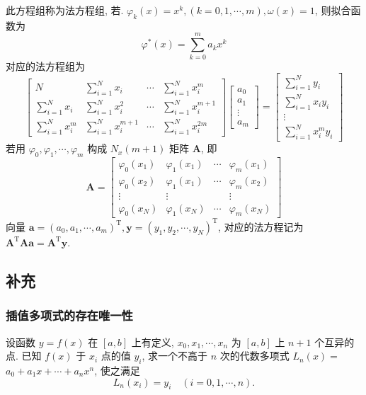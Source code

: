 此方程组称为法方程组,
若. $ \varphi_{k}(x)=x^{k},(k=0,1, \cdots, m), \omega(x)=1 $, 则拟合函数为
$$
\varphi^{*}(x)=\sum_{k=0}^{m} a_{k} x^{k}
$$
对应的法方程组为
$$
\left[\begin{array}{llll}
N &\sum\limits_{i=1}^{N} x_{i} & \cdots & \sum\limits_{i=1}^{N} x_{i}^{m} \\
\sum\limits_{i=1}^{N} x_{i} & \sum\limits_{i=1}^{N} x_{i}^{2} & \cdots & \sum\limits_{i=1}^{N} x_{i}^{m+1} \\
\sum\limits_{i=1}^{N} x_{i}^{m} & \sum\limits_{i=1}^{N} x_{i}^{m+1} & \cdots & \sum\limits_{i=1}^{N} x_{i}^{2 m}
\end{array}\right]\left[\begin{array}{c}
a_{0} \\
a_{1} \\
\vdots \\
a_{m}
\end{array}\right]=\left[\begin{array}{l}
\sum\limits_{i=1}^{N} y_{i} \\
\sum\limits_{i=1}^{N} x_{i} y_{i} \\
\vdots \\
\sum\limits_{i=1}^{N} x_{i}^{m} y_{i}
\end{array}\right]
$$
若用 $ \varphi_{0}, \varphi_{1}, \cdots, \varphi_{m} $ 构成 $ N_{x}(m+1) $ 矩阵 $ \boldsymbol{A} $, 即
$$
\boldsymbol{A}=\left[\begin{array}{cccc}
\varphi_{0}\left(x_{1}\right) & \varphi_{1}\left(x_{1}\right) & \cdots & \varphi_{m}\left(x_{1}\right) \\
\varphi_{0}\left(x_{2}\right) & \varphi_{1}\left(x_{1}\right) & \cdots & \varphi_{m}\left(x_{2}\right) \\
\vdots & \vdots & & \vdots \\
\varphi_{0}\left(x_{N}\right) & \varphi_{1}\left(x_{N}\right) & \cdots & \varphi_{m}\left(x_{N}\right)
\end{array}\right]
$$
向量 $ \boldsymbol{a}=\left(a_{0}, a_{1}, \cdots, a_{m}\right)^{\mathrm{T}}, \boldsymbol{y}=\left(y_{1}, y_{2}, \cdots, y_{N}\right)^{\mathrm{T}} $, 对应的法方程记为 $ \boldsymbol{A}^{\mathrm{T}} \boldsymbol{A} \boldsymbol{a}=\boldsymbol{A}^{\mathrm{T}} \boldsymbol{y} $.


\subsection{补充}

\subsubsection{插值多项式的存在唯一性}
设函数 $ y=f(x) $ 在 $ [a, b] $ 上有定义, $ x_{0}, x_{1}, \cdots, x_{n} $ 为 $ [a, b] $ 上 $ n+1 $ 个互异的点. 已知 $ f(x) $ 于 $ x_{i} $ 点的值 $ y_{i} $, 求一个不高于 $ n $ 次的代数多项式 $ L_{n}(x)= $ $ a_{0}+a_{1} x+\cdots+a_{n} x^{n} $, 使之满足
$$
L_{n}\left(x_{i}\right)=y_{i} \quad(i=0,1, \cdots, n) .
$$

